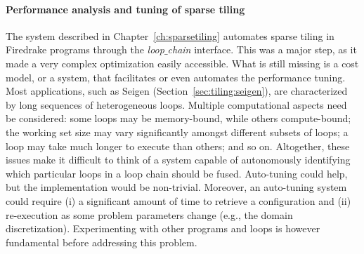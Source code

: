 \paragraph{Performance analysis and tuning of sparse tiling}
The system described in Chapter~\ref{ch:sparsetiling} automates sparse tiling in Firedrake programs through the {\em loop$\_$chain} interface. This was a major step, as it made a very complex optimization easily accessible. What is still missing is a cost model, or a system, that facilitates or even automates the performance tuning. Most applications, such as Seigen (Section~\ref{sec:tiling:seigen}), are characterized by long sequences of heterogeneous loops. Multiple computational aspects need be considered: some loops may be memory-bound, while others compute-bound; the working set size may vary significantly amongst different subsets of loops; a loop may take much longer to execute than others; and so on. Altogether, these issues make it difficult to think of a system capable of autonomously identifying which particular loops in a loop chain should be fused. Auto-tuning could help, but the implementation would be non-trivial. Moreover, an auto-tuning system could require (i) a significant amount of time to retrieve a configuration and (ii) re-execution as some problem parameters change (e.g., the domain discretization). Experimenting with other programs and loops is however fundamental before addressing this problem.


